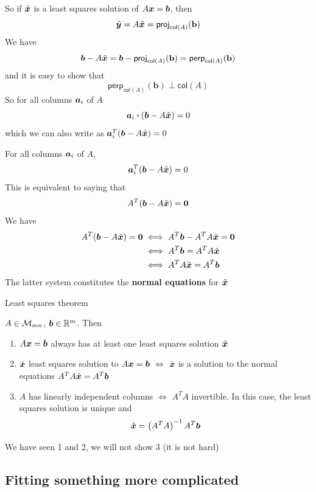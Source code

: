\documentclass[aspectratio=169]{beamer}\usepackage[]{graphicx}\usepackage[]{xcolor}
\begin{document}
\begin{frame}
So if $\tilde{\bm{x}}$ is a least squares solution of $A\bm{x}=\bm{b}$, then
\[
\tilde{\bm{y}} = A\tilde{\bm{x}} = \mathsf{proj}_{\mathsf{col}(A)}(\mathbf{b})
\]
\vfill
We have
\[
\bm{b}-A\tilde{\bm{x}} = \bm{b}-\mathsf{proj}_{\mathsf{col}(A)}(\mathbf{b}) 
= \mathsf{perp}_{\mathsf{col}(A)}(\mathbf{b})
\]
and it is easy to show that
\[
\mathsf{perp}_{\mathsf{col}(A)}(\mathbf{b}) \perp \mathsf{col}(A)
\]
\vfill
So for all columns $\bm{a}_i$ of $A$
\[
\bm{a}_i\boldsymbol{\cdot}(\bm{b}-A\tilde{\bm{x}}) = 0
\]
which we can also write as $\bm{a}_i^T(\bm{b}-A\tilde{\bm{x}}) = 0$
\end{frame}

\begin{frame}
For all columns $\bm{a}_i$ of $A$,
\[\bm{a}_i^T(\bm{b}-A\tilde{\bm{x}}) = 0
\]
\vfill
This is equivalent to saying that
\[
A^T(\bb-A\tilde\bx) = \b0
\]
\vfill
We have
\begin{align*}
A^T(\bb-A\tilde\bx) = \b0 &\iff A^T\bb - A^TA\tilde\bx = \b0 \\
&\iff A^T\bb = A^TA\tilde\bx \\
&\iff A^TA\tilde\bx = A^T\bb
\end{align*}
The latter system constitutes the \textbf{normal equations} for $\tilde{\bm{x}}$
\end{frame}


\begin{frame}{Least squares theorem}
\begin{importanttheorem}\label{th:least_squares}
$A\in\mathcal{M}_{mn}$, $\bm{b}\in\mathbb{R}^m$. Then
\begin{enumerate}
\item $A\bm{x}=\bm{b}$ always has at least one least squares solution $\tilde{\bm{x}}$
\item $\tilde{\bm{x}}$ least squares solution to $A\bm{x}=\bm{b}$ $\iff$ $\tilde{\bm{x}}$ is a solution to the normal equations $A^TA\tilde{\bm{x}} = A^T\bm{b}$
\item $A$ has linearly independent columns $\iff$ $A^TA$ invertible.  
\newline In this case, the least squares solution is unique and 
\[
\tilde{\bm{x}} = \left(A^TA\right)^{-1}A^T\bm{b}
\]
\end{enumerate}
\end{importanttheorem}
\vfill
We have seen 1 and 2, we will not show 3 (it is not hard)
\end{frame}


\subsection{Fitting something more complicated}
\end{document}
